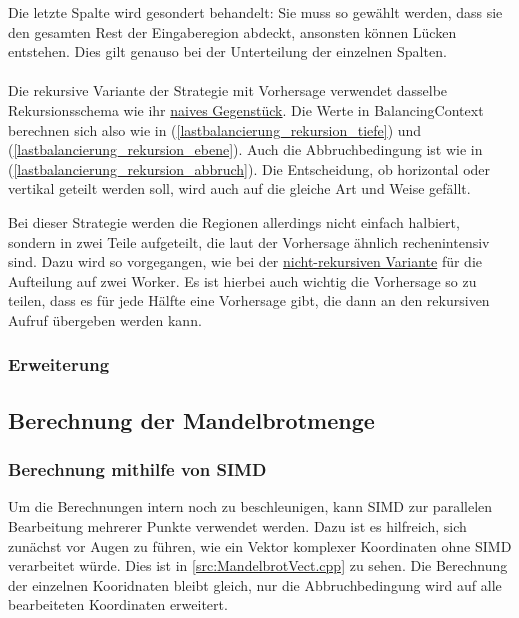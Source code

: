 Die letzte Spalte wird gesondert behandelt: Sie muss so gewählt werden, dass sie den gesamten Rest der Eingaberegion abdeckt, ansonsten können Lücken entstehen.
Dies gilt genauso bei der Unterteilung der einzelnen Spalten.

\paragraph*{}
Die rekursive Variante der Strategie mit Vorhersage verwendet dasselbe Rekursionsschema wie ihr \hyperref[lastbalancierung_naiv_rekursion]{naives Gegenstück}.
Die Werte in BalancingContext berechnen sich also wie in (\ref{lastbalancierung_rekursion_tiefe}) und (\ref{lastbalancierung_rekursion_ebene}).
Auch die Abbruchbedingung ist wie in (\ref{lastbalancierung_rekursion_abbruch}). Die Entscheidung, ob horizontal oder vertikal geteilt werden soll, wird auch auf die gleiche Art und Weise gefällt.

Bei dieser Strategie werden die Regionen allerdings nicht einfach halbiert, sondern in zwei Teile aufgeteilt, die laut der Vorhersage ähnlich rechenintensiv sind.
Dazu wird so vorgegangen, wie bei der \hyperref[lastbalancierung_vorhersage]{nicht-rekursiven Variante} für die Aufteilung auf zwei Worker.
Es ist hierbei auch wichtig die Vorhersage so zu teilen, dass es für jede Hälfte eine Vorhersage gibt, die dann an den rekursiven Aufruf übergeben werden kann.

\subsubsection{Erweiterung} \label{lastbalancierung_erweiterung}

\subsection{Berechnung der Mandelbrotmenge}

\subsubsection{Berechnung mithilfe von SIMD}

Um die Berechnungen intern noch zu beschleunigen, kann SIMD zur parallelen Bearbeitung mehrerer Punkte verwendet werden.
Dazu ist es hilfreich, sich zunächst vor Augen zu führen, wie ein Vektor komplexer Koordinaten ohne SIMD verarbeitet würde.
Dies ist in \autoref{src:MandelbrotVect.cpp} zu sehen.
Die Berechnung der einzelnen Kooridnaten bleibt gleich, nur die Abbruchbedingung wird auf alle bearbeiteten Koordinaten erweitert.

